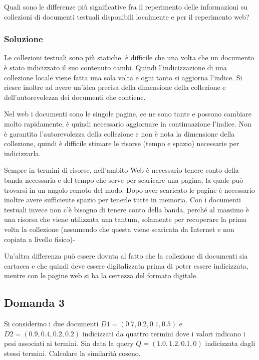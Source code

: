 Quali sono le differenze più significative fra il reperimento delle informazioni su collezioni di documenti testuali disponibili localmente e per il reperimento web?

\subsubsection{Soluzione}

Le collezioni testuali sono più statiche, è difficile che una volta che un documento è stato indicizzato il suo contenuto cambi. Quindi l'indicizzazione di una collezione locale viene fatta una sola volta e ogni tanto si aggiorna l'indice. 
Si riesce inoltre ad avere un'idea precisa della dimensione della collezione e dell'autorevolezza dei documenti che contiene. 

Nel web i documenti sono le singole pagine, ce ne sono tante e possono cambiare molto rapidamente, è quindi necessario aggiornare in continuazione l'indice. Non è garantita l'autorevolezza della collezione e non è nota la dimensione della collezione, quindi è difficile stimare le risorse (tempo e spazio) necessarie per indicizzarla.

Sempre in termini di risorse, nell'ambito Web è necessario tenere conto della banda necessaria e del tempo che serve per scaricare una pagina, la quale può trovarsi in un angolo remoto del modo. Dopo aver scaricato le pagine è necessario inoltre avere sufficiente spazio per tenerle tutte in memoria. Con i documenti testuali invece non c'è bisogno di tenere conto della banda, perché al massimo è una risorsa che viene utilizzata una tantum, solamente per recuperare la prima volta la collezione (assumendo che questa viene scaricata da Internet e non copiata a livello fisico)-

Un'altra differenza può essere dovuta al fatto che la collezione di documenti sia cartacea e che quindi deve essere digitalizzata prima di poter essere indicizzata, mentre con le pagine web si ha la certezza del formato digitale.

\subsection{Domanda 3}

Si considerino i due documenti $D1 = (0.7, 0.2, 0.1, 0.5)$ e $D2 = (0.9, 0.4, 0.2, 0.2)$ indicizzati da quattro termini dove i valori indicano i pesi associati ai termini. 
Sia data la query $Q = (1.0, 1.2, 0.1, 0)$ indicizzata dagli stessi termini. Calcolare la similarità coseno. 

